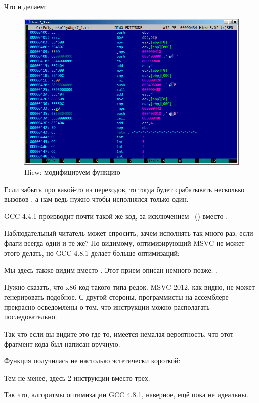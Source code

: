 \clearpage
Что и делаем:

\begin{figure}[H]
\centering
\includegraphics[scale=\FigScale]{patterns/07_jcc/simple/hiew_unsigned2.png}
\caption{Hiew: модифицируем функцию }
\label{fig:jcc_hiew_2}
\end{figure}

Если забыть про какой-то из переходов, то тогда будет срабатывать несколько вызовов \printf, 
а нам ведь нужно чтобы исполнялся только один.


\NonOptimizing GCC 4.4.1 производит почти такой же код, за исключением \puts~() вместо \printf.


Наблюдательный читатель может спросить, зачем исполнять \CMP так много раз,
если флаги всегда одни и те же?
По видимому, оптимизирующий MSVC не может этого делать, но GCC 4.8.1 делает больше оптимизаций:



Мы здесь также видим  вместо .
Этот прием описан немного позже: .

Нужно сказать, что x86-код такого типа редок.
MSVC 2012, как видно, не может генерировать подобное.
С другой стороны, программисты на ассемблере прекрасно осведомлены о том,
что инструкции  можно располагать последовательно.

Так что если вы видите это где-то, имеется немалая вероятность, что этот фрагмент кода был написан вручную.

Функция  получилась не настолько эстетически короткой:



Тем не менее, здесь 2 инструкции  вместо трех.

Так что, алгоритмы оптимизации GCC 4.8.1, наверное, ещё пока не идеальны.
